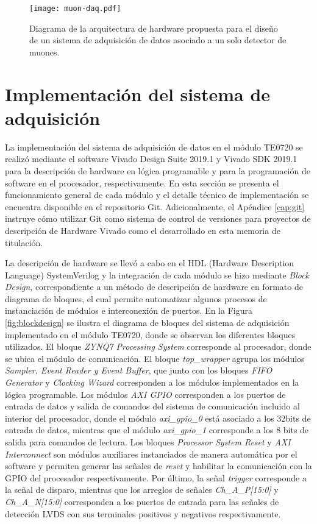		
		\begin{figure}[H]
			\centering
			\texttt{[image: muon-daq.pdf]}
			\caption{Diagrama de la arquitectura de hardware propuesta para el diseño de un sistema de adquisición de datos asociado a un solo detector de muones.}
			\label{fig:muon-daq}
		\end{figure}
		
\section{Implementación del sistema de adquisición}
\label{sec:impl}
	La implementación del sistema de adquisición de datos en el módulo TE0720 se realizó mediante el software Vivado Design Suite 2019.1 y Vivado SDK 2019.1 para la descripción de hardware en lógica programable y  para la programación de software en el procesador, respectivamente. En esta sección se presenta el funcionamiento general de cada módulo y el detalle técnico de implementación se encuentra disponible en el repositorio Git\cite{GonzalezMuonRepository}. Adicionalmente, el Apéndice \ref{cap:git} instruye cómo utilizar Git como sistema de control de versiones para proyectos de descripción de Hardware Vivado como el desarrollado en esta memoria de titulación.
	
	La descripción de hardware se llevó a cabo en el HDL (Hardware Description Language) SystemVerilog y la integración de cada módulo se hizo mediante \textit{Block Design}, correspondiente a un método de descripción de hardware en formato de diagrama de bloques, el cual permite automatizar algunos procesos de instanciación de módulos e interconexión de puertos. En la Figura \ref{fig:blockdesign} se ilustra el diagrama de bloques del sistema de adquisición implementado en el módulo TE0720, donde se observan los diferentes bloques utilizados. El bloque \textit{ZYNQ7 Processing System} corresponde al procesador, donde se ubica el módulo de comunicación. El bloque \textit{top\_wrapper} agrupa los módulos \textit{Sampler, Event Reader y Event Buffer}, que junto con los bloques \textit{FIFO Generator} y \textit{Clocking Wizard} corresponden a los módulos implementados en la lógica programable. Los módulos \textit{AXI GPIO} corresponden a los puertos de entrada de datos y salida de comandos del sistema de comunicación incluido al interior del procesador, donde el módulo \textit{axi\_gpio\_0} está asociado a los 32bits de entrada de datos, mientras que el módulo \textit{axi\_gpio\_1} corresponde a los 8 bits de salida para comandos de lectura. Los bloques \textit{Processor System Reset} y \textit{AXI Interconnect} son módulos auxiliares instanciados de manera automática por el software y permiten generar las señales de \textit{reset} y habilitar la comunicación con la GPIO del procesador respectivamente. Por último, la señal \textit{trigger} corresponde a la señal de disparo, mientras que los arreglos de señales \textit{Ch\_A\_P[15:0]} y \textit{Ch\_A\_N[15:0]} corresponden a los puertos de entrada para las señales de detección LVDS con sus terminales positivos y negativos respectivamente.

